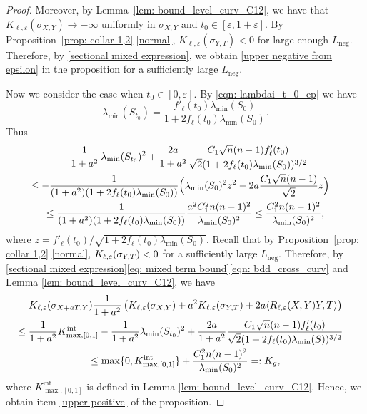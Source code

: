 \documentclass[JEP,XML,SOM,Unicode,NoFloatCountersInSection]{cedram}
\newcommand{\Int}{\mathrm{int}}
\newcommand{\Neg}{\mathrm{neg}}
\theoremstyle{definition}
\let\eps\varepsilon
\renewcommand{\>}{{\rangle}}
\newcommand{\<}{{\langle}}
\begin{document}
\begin{proof}
Moreover, by Lemma~\ref{lem: bound_level_curv_C12}, we have that $K_{\ell,\eps}(\sigma_{X,Y})\to -\infty$ uniformly in $\sigma_{X,Y}$ and $t_0\in[\eps,1+\eps]$. By Proposition~\ref{prop: collar 1,2} \eqref{normal}, $K_{\ell,\eps}(\sigma_{Y,T})<0$ for large enough $L_{\Neg}$. Therefore, by \eqref{sectional mixed expression}, we obtain \ref{upper negative from epsilon} in the proposition for a sufficiently large $L_{\Neg}$.

Now we consider the case when $t_0\in[0,\eps]$. By \eqref{eqn: lambdai_t_0_ep} we have
\[
\lambda_{\min}(S_{t_0})= \frac{f'_\ell(t_0)\lambda_{\min}(S_0)}{1+2f_\ell(t_0)\lambda_{\min}(S_0)}.
\]
Thus
\begin{multline}\label{eqn: bdd_cross_curv}
-\frac{1}{1+a^2}\,\lambda_{\min}(S_{t_0})^2+\frac{2a}{1+a^2}\frac{C_1\sqrt{n}(n-1)f'_\ell(t_0)}{\sqrt{2}(1+2f_\ell(t_0)\lambda_{\min}(S_0))^{3/2}}\\
\shoveright{\leq  -\frac{1}{(1+a^2)(1+2f_\ell(t_0)\lambda_{\min}(S_0))}\Bigl(\lambda_{\min}(S_0)^2z^2-2a\frac{C_1\sqrt{n}(n-1)}{\sqrt{2}}z \Bigr)}\\
\leq \frac{1}{(1+a^2)(1+2f_\ell(t_0)\lambda_{\min}(S_0))}\frac{a^2C_1^2n(n-1)^2}{\lambda_{\min}(S_0)^2}\leq \frac{C_1^2n(n-1)^2}{\lambda_{\min}(S_0)^2},
\end{multline}
where $z={f'_\ell(t_0)}/{\sqrt{1+2f_\ell(t_0)\lambda_{\min}(S_0)}}$. Recall that by Proposition~\ref{prop: collar 1,2} \eqref{normal}, $K_{\ell,\eps}(\sigma_{Y,T})\\< 0$ for a sufficiently large $L_{\Neg}$. Therefore, by \eqref{sectional mixed expression}\eqref{eq: mixed term bound}\eqref{eqn: bdd_cross_curv} and Lemma \ref{lem: bound_level_curv_C12}, we have
\begin{multline*}
K_{\ell,\eps}(\sigma_{X+aT,Y})\frac{1}{1+a^2}\left(K_{\ell,\eps}(\sigma_{X,Y})+a^2K_{\ell,\eps}(\sigma_{Y,T})+2a\langle R_{\ell,\eps}(X,Y)Y,T\rangle\right)\\
\shoveright{\leq  \frac{1}{1+a^2} K^{\Int}_{\max,[0,1]}-\frac{1}{1+a^2}\lambda_{\min}(S_{t_0})^2+\frac{2a}{1+a^2}\frac{C_1\sqrt{n}(n-1)f'_\ell(t_0)}{\sqrt{2}(1+2f_\ell(t_0)\lambda_{\min}(S))^{3/2}}}\\
\leq \max\{0,K^{\Int}_{\max,[0,1]}\}+\frac{C_1^2n(n-1)^2}{\lambda_{\min}(S_0)^2}=:K_g,
\end{multline*}
where $K^{\Int}_{\max,[0,1]}$ is defined in Lemma \ref{lem: bound_level_curv_C12}.
Hence, we obtain item \ref{upper positive} of the proposition.
\end{proof}
\end{document}

